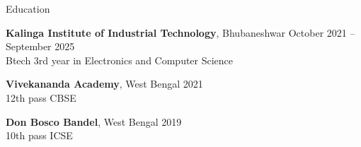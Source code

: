\documentclass{resume} %
\begin{document}
%






\begin{rSection}{Education}

{\bf Kalinga Institute of Industrial Technology}, Bhubaneshwar  \hfill {October 2021 – September 2025}\\
Btech 3rd year in Electronics and Computer Science

{\bf Vivekananda Academy}, West Bengal   \hfill {2021} \\ 12th pass CBSE

{\bf Don Bosco Bandel}, West Bengal  \hfill {2019}\\10th pass ICSE


\end{rSection}

\end{document}
